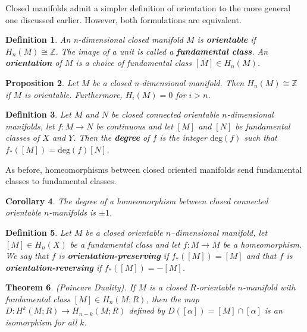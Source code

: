 \documentclass{article}
\newtheorem{theorem}{Theorem}[section]
\newtheorem{definition}[theorem]{Definition}
\newtheorem{proposition}[theorem]{Proposition}
\newtheorem{corollary}[theorem]{Corollary}
\begin{document}
\noindent Closed manifolds admit a simpler definition of orientation to the more general one discussed earlier. However, both formulations are equivalent.

\begin{definition}
An n-dimensional closed manifold $M$ is \textbf{orientable} if $H_n(M)\cong \mathbb{Z}$. The image of a unit is called a \textbf{fundamental class}. An \textbf{orientation} of $M$ is a choice of fundamental class $[M]\in H_n(M)$.
\end{definition}


\begin{proposition}
Let $M$ be a closed n-dimensional manifold. Then $H_n(M)\cong \mathbb{Z}$ if $M$ is orientable. Furthermore, $H_i(M)=0$ for $i>n$.
\end{proposition}

\begin{definition}
Let $M$ and $N$ be closed connected orientable $n$-dimensional manifolds, let $f\colon M\to N$ be continuous and let $[M]$ and $[N]$ be fundamental classes of $X$ and $Y$. Then the \textbf{degree} of $f$ is the integer $\text{deg}(f)$ such that $f_*([M])=\text{deg}(f)[N]$.
\end{definition}

\noindent As before, homeomorphisms between closed oriented manifolds send fundamental classes to fundamental classes.

\begin{corollary}
The degree of a homeomorphism between closed connected orientable $n$-manifolds is $\pm 1$.
\end{corollary}

\begin{definition}
Let $M$ be a closed orientable $n$--dimensional manifold, let $[M]\in H_n(X)$ be a fundamental class and let $f\colon M\to M$ be a homeomorphism. We say that $f$ is \textbf{orientation-preserving} if $f_*([M])=[M]$ and that $f$ is \textbf{orientation-reversing} if $f_*([M])=-[M]$.
\end{definition}




\begin{theorem}
(Poincare Duality). If $M$ is a closed $R$-orientable $n$-manifold with fundamental class $[M]\in H_n(M;R)$, then the map $D\colon H^k(M;R)\to H_{n-k}(M;R)$ defined by $D([\alpha])=[M]\cap[\alpha]$ is an isomorphism for all $k$.
\end{theorem}
\end{document}
